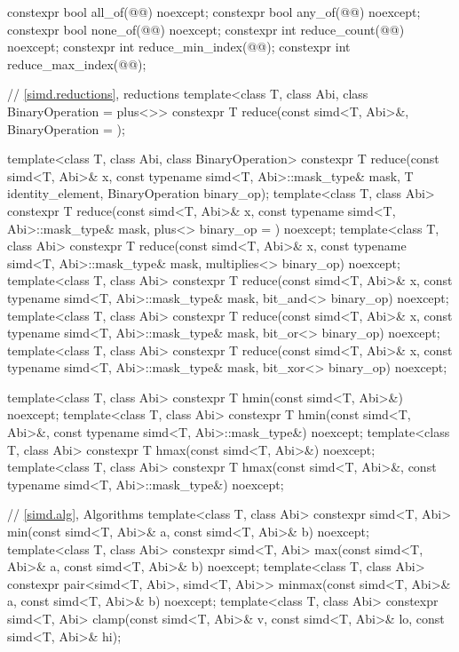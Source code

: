 \begin{codeblock}
{  constexpr bool all_of(@@) noexcept;
  constexpr bool any_of(@@) noexcept;
  constexpr bool none_of(@@) noexcept;
  constexpr int reduce_count(@@) noexcept;
  constexpr int reduce_min_index(@@);
  constexpr int reduce_max_index(@@);

  // \ref{simd.reductions},  reductions
  template<class T, class Abi, class BinaryOperation = plus<>>
    constexpr T reduce(const simd<T, Abi>&, BinaryOperation = {});

  template<class T, class Abi, class BinaryOperation>
    constexpr T reduce(const simd<T, Abi>& x, const typename simd<T, Abi>::mask_type& mask,
                       T identity_element, BinaryOperation binary_op);
  template<class T, class Abi>
    constexpr T reduce(const simd<T, Abi>& x, const typename simd<T, Abi>::mask_type& mask,
                       plus<> binary_op = {}) noexcept;
  template<class T, class Abi>
    constexpr T reduce(const simd<T, Abi>& x, const typename simd<T, Abi>::mask_type& mask,
                       multiplies<> binary_op) noexcept;
  template<class T, class Abi>
    constexpr T reduce(const simd<T, Abi>& x, const typename simd<T, Abi>::mask_type& mask,
                       bit_and<> binary_op) noexcept;
  template<class T, class Abi>
    constexpr T reduce(const simd<T, Abi>& x, const typename simd<T, Abi>::mask_type& mask,
                       bit_or<> binary_op) noexcept;
  template<class T, class Abi>
    constexpr T reduce(const simd<T, Abi>& x, const typename simd<T, Abi>::mask_type& mask,
                       bit_xor<> binary_op) noexcept;

  template<class T, class Abi>
    constexpr T hmin(const simd<T, Abi>&) noexcept;
  template<class T, class Abi>
    constexpr T hmin(const simd<T, Abi>&, const typename simd<T, Abi>::mask_type&) noexcept;
  template<class T, class Abi>
    constexpr T hmax(const simd<T, Abi>&) noexcept;
  template<class T, class Abi>
    constexpr T hmax(const simd<T, Abi>&, const typename simd<T, Abi>::mask_type&) noexcept;

  // \ref{simd.alg}, Algorithms
  template<class T, class Abi>
    constexpr simd<T, Abi>
      min(const simd<T, Abi>& a, const simd<T, Abi>& b) noexcept;
  template<class T, class Abi>
    constexpr simd<T, Abi>
      max(const simd<T, Abi>& a, const simd<T, Abi>& b) noexcept;
  template<class T, class Abi>
    constexpr pair<simd<T, Abi>, simd<T, Abi>>
      minmax(const simd<T, Abi>& a, const simd<T, Abi>& b) noexcept;
  template<class T, class Abi>
    constexpr simd<T, Abi>
      clamp(const simd<T, Abi>& v,
            const simd<T, Abi>& lo,
            const simd<T, Abi>& hi);
}
\end{codeblock}

